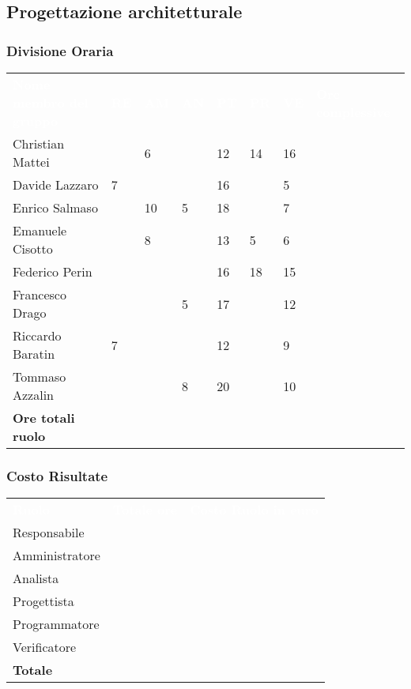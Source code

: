 \subsection{Progettazione architetturale}

\subsubsection{Divisione Oraria}
{
	\renewcommand{\arraystretch}{2}
	\centering
	\begin{longtable}{ C{5cm} C{1cm} C{1cm} C{1cm} C{1cm} C{1cm} C{1cm} C{3cm}}
		\textcolor{white}{\textbf{Nome membro del gruppo}} & \textcolor{white}{\textbf{RE}} & \textcolor{white}{\textbf{AM}} & \textcolor{white}{\textbf{AN}} & \textcolor{white}{\textbf{PT}} & \textcolor{white}{\textbf{PR}} & \textcolor{white}{\textbf{VE}} & \textcolor{white}{\textbf{Ore complessive}}\\	
        
        Christian Mattei & & 6 & & 12 & 14 & 16 & \\
        Davide Lazzaro & 7 & & & 16 & & 5 & \\
        Enrico Salmaso & & 10 & 5 & 18 & & 7 & \\
        Emanuele Cisotto & & 8 & & 13 & 5 & 6  & \\
        Federico Perin & & & & 16 & 18 & 15 & \\
        Francesco Drago & & & 5 & 17 & & 12 & \\
        Riccardo Baratin & 7 & & & 12 & & 9 & \\
        Tommaso Azzalin & & & 8 & 20 & & 10 & \\
        \textbf{Ore totali ruolo} & & & & & & & \\
		
	\end{longtable}
}

\subsubsection{Costo Risultate}
{
	\renewcommand{\arraystretch}{2}
	\centering
	\begin{longtable}{ C{3cm} C{2cm} C{4cm}}
		\textcolor{white}{\textbf{Ruolo}} & \textcolor{white}{\textbf{Totale ore}} & \textcolor{white}{\textbf{Costo Ruolo in euro}}\\	
        
        Responsabile & & \\
        Amministratore & & \\
        Analista & & \\
        Progettista & & \\
        Programmatore & & \\
        Verificatore & & \\
        \textbf{Totale} & & \\
		
	\end{longtable}
}

